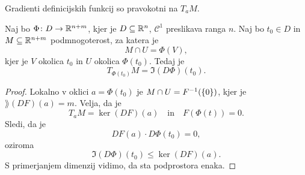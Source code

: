 \begin{opomba}
Gradienti definicijskih funkcij so pravokotni na $T_aM$.
\end{opomba}

\begin{posledica}
Naj bo $\Phi \colon D \to \mathbb{R}^{n+m}$, kjer je $D \subseteq \mathbb{R}^n$,
$\mathcal{C}^1$ preslikava ranga $n$. Naj bo $t_0 \in D$ in
$M \subseteq \mathbb{R}^{n+m}$ podmnogoterost, za katera je
\[
M \cap U = \Phi(V),
\]
kjer je $V$ okolica $t_0$ in $U$ okolica $\Phi(t_0)$. Tedaj je
\[
T_{\Phi(t_0)}M = \Im(D\Phi)(t_0).
\]
\end{posledica}

\begin{proof}
Lokalno v oklici $a = \Phi(t_0)$ je $M \cap U = F^{-1}(\left\{0\right\})$,
kjer je $\rang(DF)(a) = m$. Velja, da je
\[
T_aM = \ker(DF)(a)
\quad \text{in} \quad
F(\Phi(t)) = 0.
\]
Sledi, da je
\[
DF(a) \cdot D\Phi(t_0) = 0,
\]
oziroma
\[
\Im(D\Phi)(t_0) \leq \ker(DF)(a).
\]
S primerjanjem dimenzij vidimo, da sta podprostora enaka.
\end{proof}
